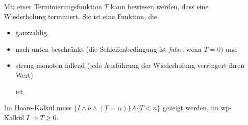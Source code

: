 \documentclass{lehramt-informatik-aufgabe}
\begin{document}
\begin{enumerate}
\begin{liAntwort}
Mit einer Terminierungsfunktion $T$ kann bewiesen werden, dass eine
Wiederholung terminiert. Sie ist eine Funktion, die

\begin{itemize}
\item ganzzahlig,

\item nach unten beschränkt (die Schleifenbedingung ist \emph{false},
wenn $T = 0$) und

\item streng monoton fallend (jede Ausführung der Wiederholung
verringert ihren Wert)

ist.

\end{itemize}
Im Hoare-Kalkül muss $\{I \land b \land (T = n)\} A \{T < n\}$ gezeigt
werden, im wp-Kalkül $I \Rightarrow T \geq
0$.
\end{liAntwort}

\end{enumerate}
\end{document}
